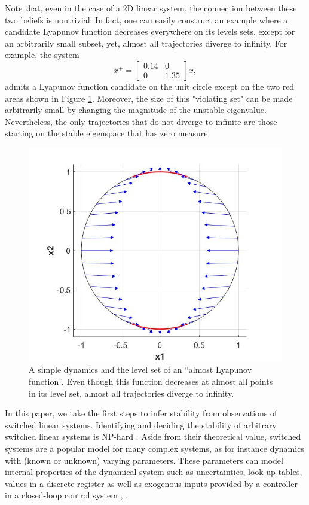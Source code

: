 Note that, even in the case of a 2D linear system, the connection between these two beliefs is nontrivial. In fact, one can easily construct an example where a candidate Lyapunov function decreases everywhere on its levels sets, except for an arbitrarily small subset, yet, almost all trajectories diverge to infinity. For example, the system
\[
x^+ = \begin{bmatrix}
0.14 & 0\\
0 & 1.35
\end{bmatrix}x,
\]
admits a Lyapunov function candidate on the unit circle except on the two red areas shown in Figure \ref{fig:levelset}.
Moreover, the size of this "violating set" can be made arbitrarily small by changing the magnitude of the unstable eigenvalue. Nevertheless, the only trajectories that do not diverge to infinite are those starting on the stable eigenspace that has zero measure.
\begin{figure}
\begin{center}
\includegraphics[trim = 15mm 15mm 10mm 10mm, scale=0.3]{ex1.jpg}
\end{center}
\label{fig:levelset}
\caption{A simple dynamics and the level set of an ``almost Lyapunov function''. Even though this function decreases at almost all points in its level set, almost all trajectories diverge to infinity.}
\end{figure}

In this paper, we take the first steps to infer stability from observations of switched linear systems. Identifying and deciding the stability of arbitrary switched linear systems is NP-hard \cite{jungersBook}. Aside from their theoretical value, switched systems are a popular model for many complex systems, as for instance dynamics with (known or unknown) varying parameters. These parameters can model internal properties of the dynamical system such as uncertainties, look-up tables, values in a discrete register as well as exogenous inputs provided by a controller in a closed-loop control system \cite{liberzon-switching}, \cite{sun-ge}.

